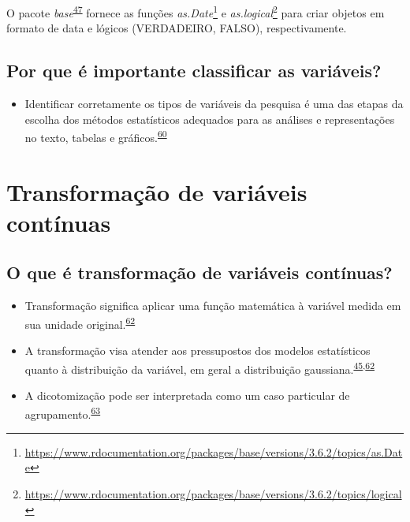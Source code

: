 \documentclass[
  a4paper,
]{book}
\providecommand{\tightlist}{%
  \setlength{\itemsep}{0pt}\setlength{\parskip}{0pt}}
\renewcommand{\href}[2]{#2\footnote{\url{#1}}}
\newenvironment{infobox}[1]
  {
  \begin{itemize}
  \renewcommand{\labelitemi}{
    \raisebox{-.7\height}[0pt][0pt]{
      {\setkeys{Gin}{width=3em,keepaspectratio}
        \texttt{[image: \#1]}}
    }
  }
  \setlength{\fboxsep}{1em}
  \begin{blackbox}
  \item
  }
  {
  \end{blackbox}
  \end{itemize}
  }
\begin{document}
\begin{infobox}{images/Rlogo}
O pacote \emph{base}\textsuperscript{\protect\hyperlink{ref-base-2}{47}} fornece as funções \href{https://www.rdocumentation.org/packages/base/versions/3.6.2/topics/as.Date}{\emph{as.Date}} e \href{https://www.rdocumentation.org/packages/base/versions/3.6.2/topics/logical}{\emph{as.logical}} para criar objetos em formato de data e lógicos (VERDADEIRO, FALSO), respectivamente.

\end{infobox}

\hypertarget{por-que-uxe9-importante-classificar-as-variuxe1veis}{%
\subsection{Por que é importante classificar as variáveis?}\label{por-que-uxe9-importante-classificar-as-variuxe1veis}}

\begin{itemize}
\tightlist
\item
  Identificar corretamente os tipos de variáveis da pesquisa é uma das etapas da escolha dos métodos estatísticos adequados para as análises e representações no texto, tabelas e gráficos.\textsuperscript{\protect\hyperlink{ref-Dettori2018}{60}}
\end{itemize}

\hypertarget{transformacao}{%
\section{Transformação de variáveis contínuas}\label{transformacao}}

\hypertarget{o-que-uxe9-transformauxe7uxe3o-de-variuxe1veis-contuxednuas}{%
\subsection{O que é transformação de variáveis contínuas?}\label{o-que-uxe9-transformauxe7uxe3o-de-variuxe1veis-contuxednuas}}

\begin{itemize}
\item
  Transformação significa aplicar uma função matemática à variável medida em sua unidade original.\textsuperscript{\protect\hyperlink{ref-Bland1996}{62}}
\item
  A transformação visa atender aos pressupostos dos modelos estatísticos quanto à distribuição da variável, em geral a distribuição gaussiana.\textsuperscript{\protect\hyperlink{ref-vetter2017}{45},\protect\hyperlink{ref-Bland1996}{62}}
\item
  A dicotomização pode ser interpretada como um caso particular de agrupamento.\textsuperscript{\protect\hyperlink{ref-Fedorov2009}{63}}
\end{itemize}
\end{document}

